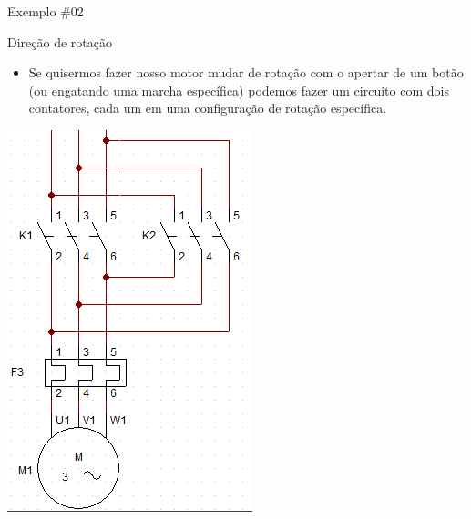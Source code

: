 \begin{frame}{Exemplo \#02}
\begin{block}{Direção de rotação}
\begin{itemize}
    \item Se quisermos fazer nosso motor mudar de rotação com o apertar de um botão (ou engatando uma marcha específica) podemos fazer um circuito com dois contatores, cada um em uma configuração de rotação específica.
\end{itemize}
\end{block}
\centerline{\includegraphics[height=0.6\textheight]{Figuras/Ch07/fig8.jpg}}
\end{frame}


